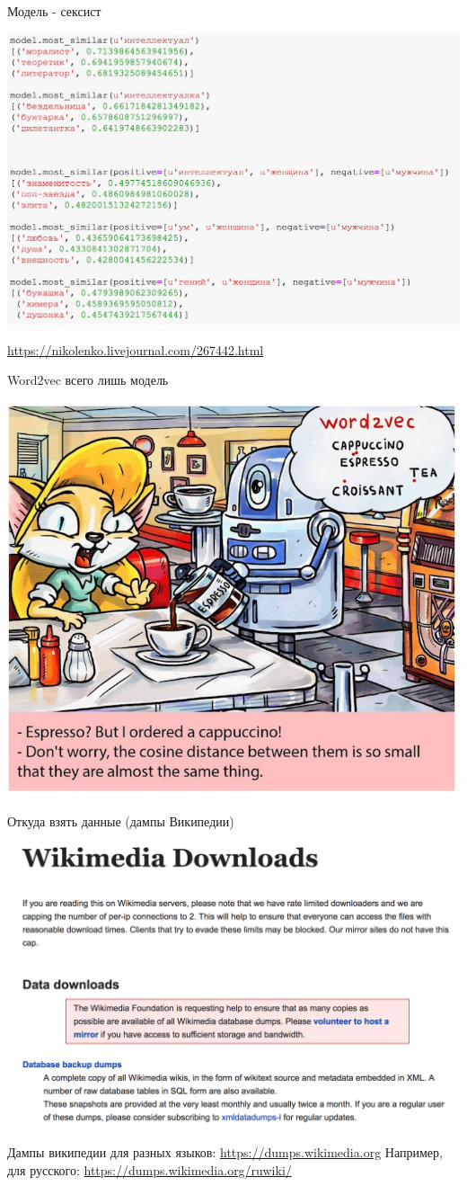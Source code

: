 \documentclass[notes,12pt, aspectratio=169]{beamer}
\begin{document}
\begin{frame}{Модель - сексист}
	\begin{center}
		\includegraphics[width=.65\linewidth]{w2v_sex.png}
	\end{center}
	\vfill
	\footnotesize  {\color{blue} \url{https://nikolenko.livejournal.com/267442.html}}
\end{frame} 


\begin{frame}{Word2vec всего лишь модель}
	\begin{center}
		\includegraphics[width=.55\linewidth]{w2v_idiot.jpg}
	\end{center}
\end{frame} 


\begin{frame}{Откуда взять данные (дампы Википедии)}
	\begin{center}
		\includegraphics[width=.7\linewidth]{wiki_dumps.png}
	\end{center}
	
	\vfill
	
	\footnotesize Дампы википедии для разных языков:  {\color{blue} \url{https://dumps.wikimedia.org}} \newline Например, для русского:  {\color{blue} \url{https://dumps.wikimedia.org/ruwiki/}} 
\end{frame} 
\end{document}

